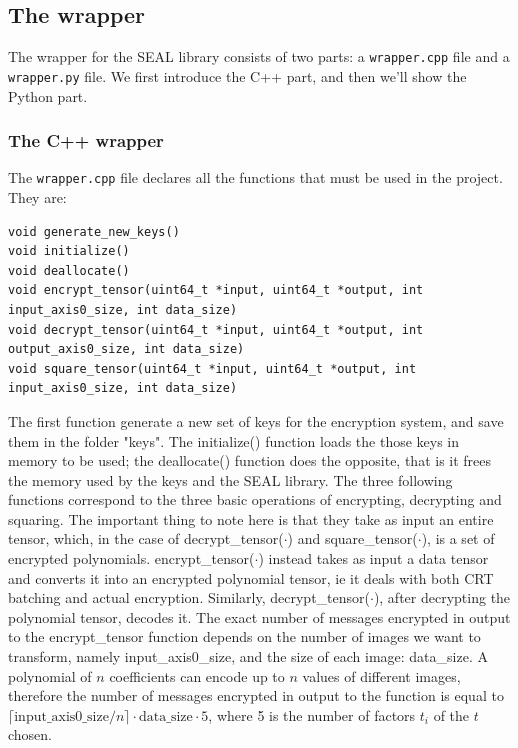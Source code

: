 \subsection{The wrapper}

The wrapper for the SEAL library consists of two parts: a \texttt{wrapper.cpp} file and a \texttt{wrapper.py} file. We first introduce the C++ part, and then we'll show the Python part.

\subsubsection{The C++ wrapper}

The \texttt{wrapper.cpp} file declares all the functions that must be used in the project. They are:


\begin{lstlisting}[frame=single]
void generate_new_keys()
void initialize()
void deallocate()
void encrypt_tensor(uint64_t *input, uint64_t *output, int input_axis0_size, int data_size)
void decrypt_tensor(uint64_t *input, uint64_t *output, int output_axis0_size, int data_size)
void square_tensor(uint64_t *input, uint64_t *output, int input_axis0_size, int data_size)
\end{lstlisting}

The first function generate a new set of keys for the encryption system, and save them in the folder "keys". The initialize() function loads the those keys in memory to be used; the deallocate() function does the opposite, that is it frees the memory used by the keys and the SEAL library. The three following functions correspond to the three basic operations of encrypting, decrypting and squaring. The important thing to note here is that they take as input an entire tensor, which, in the case of decrypt_tensor($\cdot$) and square_tensor($\cdot$), is a set of encrypted polynomials. encrypt_tensor($\cdot$) instead takes as input a data tensor and converts it into an encrypted polynomial tensor, ie it deals with both CRT batching and actual encryption. Similarly, decrypt_tensor($\cdot$), after decrypting the polynomial tensor, decodes it. The exact number of messages encrypted in output to the encrypt_tensor function depends on the number of images we want to transform, namely input_axis0_size, and the size of each image: data_size. A polynomial of $n$ coefficients can encode up to $n$ values of different images, therefore the number of messages encrypted in output to the function is equal to $\lceil \text{input_axis0_size}/n\rceil\cdot\text{data_size}\cdot5$, where 5 is the number of factors $t_i$ of the $t$ chosen.

